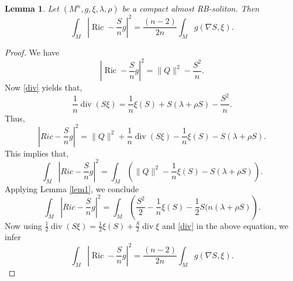 \documentclass[10pt,a4paper]{amsart}
\newtheorem{lemma}{Lemma}
\begin{document}
\begin{lemma}\label{lem2}
     Let $(M^n, g, \xi, \lambda,\rho)$ be a compact almost RB-soliton. Then
    \begin{equation}\label{10.3}
        \int_M\left|\operatorname{Ric}-\frac{S}{n} g\right|^{2} =  \frac{(n-2)}{2n}\int_M g(\nabla S,\xi).
    \end{equation}
\end{lemma}

\begin{proof}

    We have
    \begin{equation}\label{ricsbyn}
        \left|\operatorname{Ric}-\frac{S}{n} g\right|^{2}=\|Q\|^{2}-\frac{S^{2}}{n}.
    \end{equation}
Now \eqref{div} yields that,
$$
\frac{1}{n} \operatorname{div}(S \xi)=\frac{1}{n} \xi(S)+ S(\lambda +\rho S)-\frac{S^{2}}{n}.
$$
Thus,
$$
\left|R i c-\frac{S}{n} g\right|^{2}=\|Q\|^{2}+\frac{1}{n} \operatorname{div}(S \xi)-\frac{1}{n} \xi(S)-S(\lambda + \rho S).
$$
This implies that,
$$
\int_{M}\left|R i c-\frac{S}{n} g\right|^{2}=\int_{M}\left(\|Q\|^2-\frac{1}{n}\xi(S)-S(\lambda+\rho S)\right) .
$$
Applying Lemma \ref{lem1}, we conclude
$$
\int_{M}\left|R i c-\frac{S}{n} g\right|^{2}=\int_{M}\left(\frac{S^2}{2}-\frac{1}{n}\xi(S)-\frac{1}{2}S(n(\lambda+\rho S)\right) .
$$
Now using  $\frac{1}{2} \operatorname{div}(S \xi) = \frac{1}{2}\xi(S)+ \frac{S}{2} \operatorname{div} \xi$ and  \eqref{div} in the above equation, we infer
    \begin{equation}\label{10}
    \int_M\left|\operatorname{Ric}-\frac{S}{n} g\right|^{2}=\frac{(n-2)}{2n}\int_M g(\nabla S,\xi).
\end{equation}
\end{proof}
\end{document}
